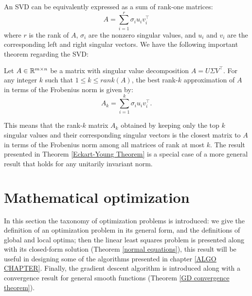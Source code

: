 \par
An SVD can be equivalently expressed as a sum of rank-one matrices:
    \begin{equation}
        A = \sum_{i=1}^{r} \sigma_i u_i v_i^\top
    \end{equation}
    where $r$ is the rank of $A$, $\sigma_i$ are the nonzero singular values, and $u_i$ and $v_i$ are the corresponding left and right singular vectors.
We have the following important theorem regarding the SVD:
\begin{theorem} \label{Eckart-Young Theorem}
    Let $A \in \mathbb{R}^{m \times n}$ be a matrix with singular value decomposition $A = U \Sigma V^\top$. For any integer $k$ such that $1 \leq k \leq rank(A)$, the best rank-$k$ approximation of $A$ in terms of the Frobenius norm is given by:
    \begin{equation}
        A_k = \sum_{i=1}^{k} \sigma_i u_i v_i^\top.
    \end{equation}
\end{theorem}
This means that the rank-$k$ matrix $A_k$ obtained by keeping only the top $k$ singular values and their corresponding singular vectors is the closest matrix to $A$ in terms of the Frobenius norm among all matrices of rank at most $k$.
The result presented in Theorem \ref{Eckart-Young Theorem} is a special case of a more general result that holds for any unitarily invariant norm.
\section{Mathematical optimization} \label{optimization section}
In this section the taxonomy of optimization problems is introduced: we give the definition of an optimization problem in its general form, and the definitions of global and local optima; then the 
linear least squares problem is presented along with its closed-form solution (Theorem \ref{normal equations}), this result will be useful in designing some of the algorithms presented in chapter \ref{ALGO CHAPTER}.
Finally, the gradient descent algorithm is introduced along with a convergence result for general smooth functions (Theorem \ref{GD convergence theorem}).
